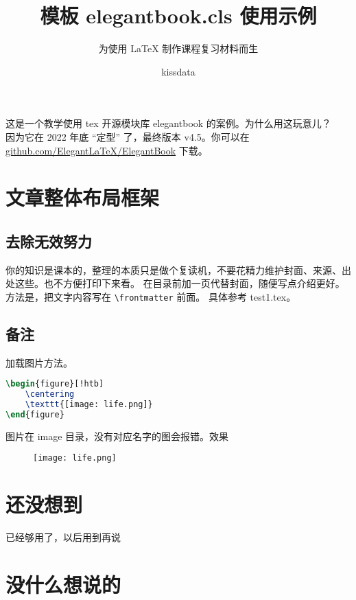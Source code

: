 \documentclass[lang=cn,newtx,10pt,scheme=chinese]{elegantbook}
\title{模板 elegantbook.cls 使用示例}
\subtitle{为使用 \LaTeX{} 制作课程复习材料而生}
\author{kissdata}
\begin{document}
	
	\maketitle %

这是一个教学使用 tex 开源模块库 elegantbook 的案例。为什么用这玩意儿？\\
因为它在 2022 年底 “定型” 了，最终版本 v4.5。你可以在
\href{https://github.com/ElegantLaTeX/ElegantBook/releases}{github.com/ElegantLaTeX/ElegantBook} 下载。

	\frontmatter  %
	\tableofcontents %
	\mainmatter %



\chapter{文章整体布局框架}
	
	\section{去除无效努力}
	
	你的知识是课本的，整理的本质只是做个复读机，不要花精力维护封面、来源、出处这些。也不方便打印下来看。
	在目录前加一页代替封面，随便写点介绍更好。方法是，把文字内容写在 \lstinline|\frontmatter| 前面。
	具体参考 test1.tex。

	\section*{备注}
	
	加载图片方法。

\begin{lstlisting}[language=tex]
\begin{figure}[!htb]
	\centering
	\texttt{[image: life.png]}
\end{figure}
\end{lstlisting}

图片在 image 目录，没有对应名字的图会报错。效果

	\begin{figure}[!htb]
		\centering
		\texttt{[image: life.png]}
	\end{figure}


\chapter{还没想到}

已经够用了，以后用到再说



\nocite{*}
\printbibliography[heading=bibintoc, title=\ebibname]

\appendix 

\chapter{没什么想说的}

	
\end{document}
